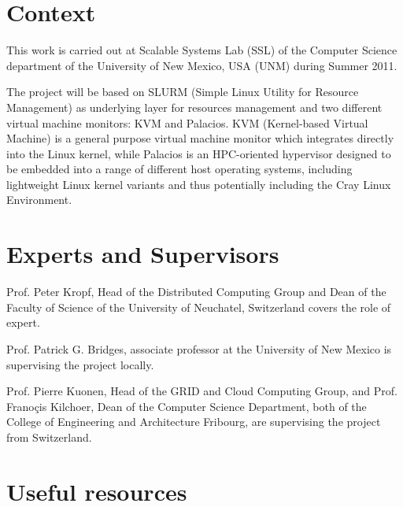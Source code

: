 \documentclass[10pt,authoryear]{sigplanconf} %
\begin{document}

\appendix
\section{Context}

This work is carried out at Scalable Systems Lab (SSL) of the Computer Science department of the University of New Mexico, USA (UNM) during Summer 2011.

The project will be based on SLURM (Simple Linux Utility for Resource Management) as underlying layer for resources management and two different virtual machine monitors: KVM and Palacios. KVM (Kernel-based Virtual Machine) is a general purpose virtual machine monitor which integrates directly into the Linux kernel, while Palacios is an HPC-oriented hypervisor designed to be embedded into a range of different host operating systems, including lightweight Linux kernel variants and thus potentially including the Cray Linux Environment.


\section{Experts and Supervisors}

Prof. Peter Kropf, Head of the Distributed Computing Group and Dean of the Faculty of Science of the University of Neuchatel, Switzerland covers the role of expert.

Prof. Patrick G. Bridges, associate professor at the University of New Mexico is supervising the project locally.

Prof. Pierre Kuonen, Head of the GRID and Cloud Computing Group, and Prof. Frano\c{c}is Kilchoer, Dean of the Computer Science Department, both of the College of Engineering and Architecture Fribourg, are supervising the project from Switzerland.


\section{Useful resources}
\end{document}
